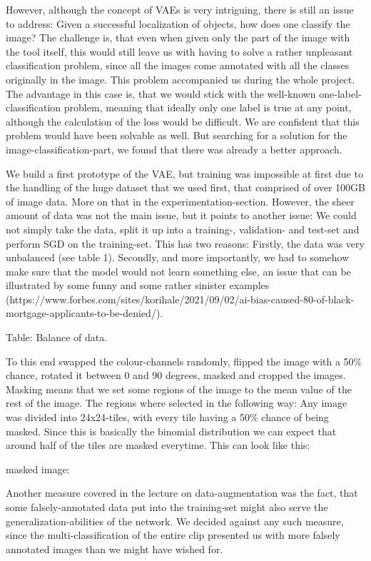 However, although the concept of VAEs is very intriguing, there is still an issue to address: Given a successful localization of objects, how does one classify the image?
The challenge is, that even when given only the part of the image with the tool itself, this would still leave us with having to solve a rather unpleasant classification problem, since all the images come annotated with all the classes originally in the image. This problem accompanied us during the whole project. The advantage in this case is, that we would stick with the well-known one-label-classification problem, meaning that ideally only one label is true at any point, although the calculation of the loss would be difficult. We are confident that this problem would have been solvable as well. But searching for a solution for the image-classification-part, we found that there was already a better approach.

We build a first prototype of the VAE, but training was impossible at first due to the handling of the huge dataset that we used first, that comprised of over 100GB of image data. More on that in the experimentation-section. However, the sheer amount of data was not the main issue, but it points to another issue: We could not simply take the data, split it up into a training-, validation- and test-set and perform SGD on the training-set. 
This has two reasons: Firstly, the data was very unbalanced (see table 1). Secondly, and more importantly, we had to somehow make sure that the model would not learn something else, an issue that can be illustrated by some funny and some rather sinister examples (https://www.forbes.com/sites/korihale/2021/09/02/ai-bias-caused-80-of-black-mortgage-applicants-to-be-denied/).

Table: Balance of data.

To this end swapped the colour-channels randomly, flipped the image with a 50\% chance, rotated it between 0 and 90 degrees, masked and cropped the images. Masking means that we set some regions of the image to the mean value of the rest of the image. The regions where selected in the following way: Any image was divided into 24x24-tiles, with every tile having a 50\% chance of being masked. Since this is basically the binomial distribution we can expect that around half of the tiles are masked everytime. This can look like this:

masked image:

Another measure covered in the lecture on data-augmentation was the fact, that some falsely-annotated data put into the training-set might also serve the generalization-abilities of the network. We decided against any such measure, since the multi-classification of the entire clip presented us with more falsely annotated images than we might have wished for.

